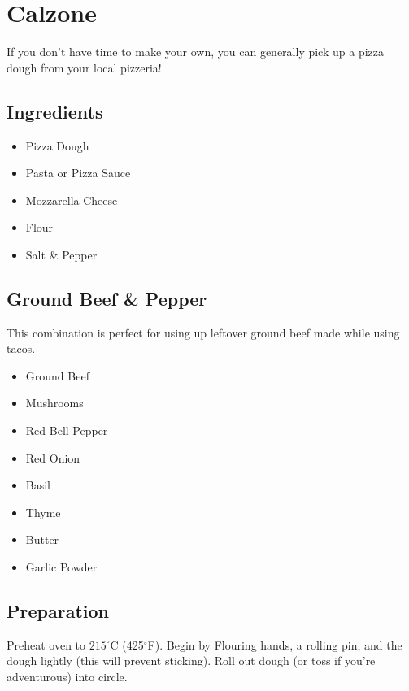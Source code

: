 \thispagestyle{fancy}
\section{Calzone}
\AddToShipoutPicture*{\Calzone}
If you don't have time to make your own, you can generally pick up a pizza dough from your local pizzeria!
\subsection*{Ingredients}
\begin{multicols}{3}
	\begin{itemize}
		\item Pizza Dough
		\item Pasta or Pizza Sauce
		\item Mozzarella Cheese
		\item Flour
		\item Salt \& Pepper
	\end{itemize}
\end{multicols}

\subsection*{Ground Beef \& Pepper}
This combination is perfect for using up leftover ground beef made while using tacos.
\begin{multicols}{3}
	\begin{itemize}
		\item Ground Beef
		\item Mushrooms
		\item Red Bell Pepper
		\item Red Onion
		\item Basil
		\item Thyme
		\item Butter
		\item Garlic Powder
	\end{itemize}
\end{multicols}

\subsection*{Preparation}

Preheat oven to $215^\circ$C (425$^\circ$F). Begin by Flouring hands, a rolling pin, and the dough lightly (this will prevent sticking). Roll out dough (or toss if you're adventurous) into circle. 